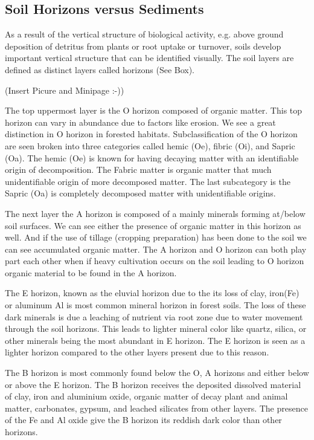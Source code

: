 \subsection{Soil Horizons versus Sediments}

As a result of the vertical structure of biological activity, e.g. above ground deposition of detritus from plants or root uptake or turnover, soils develop important vertical structure that can be identified visually. The soil layers are defined as distinct layers called horizons (See Box). %

(Insert Picure and Minipage :-))

The top uppermost layer is the O horizon composed of organic matter. This top horizon can vary in abundance due to factors like erosion.  We see a great distinction in O horizon in forested habitats. Subclassification of the O horizon are seen broken into three categories called hemic (Oe), fibric (Oi), and Sapric (Oa). The hemic (Oe) is known for having decaying matter with an identifiable origin of decomposition. The Fabric matter is organic matter that much unidentifiable origin of more decomposed matter. The last subcategory is the Sapric (Oa) is completely decomposed matter with unidentifiable origins. 

The next layer the A horizon is composed of a mainly minerals forming at/below soil surfaces. We can see either the presence of organic matter in this horizon as well. And if the use of tillage (cropping preparation) has been done to the soil we can see accumulated organic matter. The A horizon and O horizon can both play part each other when if heavy cultivation occurs on the soil leading to O horizon organic material to be found in the A horizon. 

The E horizon, known as the eluvial horizon due to the its loss of clay, iron(Fe) or aluminum Al is most common mineral horizon in forest soils. The loss of these dark minerals is due a leaching of nutrient via root zone due to water movement through the soil horizons. This leads to lighter mineral color like quartz, silica, or other minerals being the most abundant in E horizon. The E horizon is seen as a lighter horizon compared to the other layers present due to this reason.

The B horizon is most commonly found below the O, A horizons and either below or above the E horizon. The B horizon receives the deposited dissolved material of clay, iron and aluminium oxide, organic matter of decay plant and animal matter, carbonates, gypsum, and leached silicates from other layers. The presence of the Fe and Al oxide give the B horizon its reddish dark color than other horizons. 

